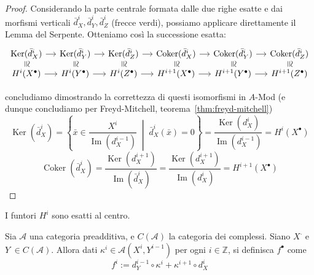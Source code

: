\begin{proof}
Considerando la parte centrale formata dalle due righe esatte e dai morfismi
verticali $\bar{d}_X^i, \bar{d}_Y^i, \bar{d}_Z^i$ (frecce verdi), possiamo
applicare direttamente il Lemma del Serpente. Otteniamo così la successione
esatta:
\[
\begin{tikzcd}[column sep=small, row sep=5pt]
    \mathrm{Ker}{(\bar{d}^{i}_X)} & \mathrm{Ker}{(\bar{d}^{i}_Y)} &
    \mathrm{Ker}{(\bar{d}^{i}_Z)} & \mathrm{Coker}{(\bar{d}^{i}_X)} &
    \mathrm{Coker}{(\bar{d}^{i}_Y)} & \mathrm{Coker}{(\bar{d}^{i}_Z)}\\
    H^{i}{(X^\bullet)} & H^{i}{(Y^\bullet)} & H^{i}{(Z^\bullet)} &
    H^{i+1}{(X^\bullet)} & H^{i+1}{(Y^\bullet)} & H^{i+1}{(Z^\bullet)}
	\arrow[from=1-1, to=1-2]
	\arrow["\cong"{marking, allow upside down}, draw=none, from=1-1, to=2-1]
	\arrow[from=1-2, to=1-3]
	\arrow["\cong"{marking, allow upside down}, draw=none, from=1-2, to=2-2]
	\arrow[from=1-3, to=1-4]
	\arrow["\cong"{marking, allow upside down}, draw=none, from=1-3, to=2-3]
	\arrow[from=1-4, to=1-5]
	\arrow["\cong"{marking, allow upside down}, draw=none, from=1-4, to=2-4]
	\arrow[from=1-5, to=1-6]
	\arrow["\cong"{marking, allow upside down}, draw=none, from=1-5, to=2-5]
	\arrow["\cong"{marking, allow upside down}, draw=none, from=1-6, to=2-6]
	\arrow[from=2-1, to=2-2]
	\arrow[from=2-2, to=2-3]
	\arrow[from=2-3, to=2-4]
	\arrow[from=2-4, to=2-5]
	\arrow[from=2-5, to=2-6]
\end{tikzcd}\]

concludiamo dimostrando la correttezza di questi isomorfismi in \(A\)-Mod (e
dunque concludiamo per Freyd-Mitchell, teorema~\ref{thm:freyd-mitchell})
    \[
    \operatorname{Ker}(\bar{d}_X^i) = \left\{ \bar{x} \in \frac{X^i}{\operatorname{Im}(d_X^{i-1})} \;\middle|\; \bar{d}_X^i(\bar{x}) = 0 \right\} = \frac{\operatorname{Ker}(d_X^i)}{\operatorname{Im}(d_X^{i-1})} = H^i(X^\bullet)
    \]
    \[
    \operatorname{Coker}(\bar{d}_X^i) = \frac{\operatorname{Ker}(d_X^{i+1})}{\operatorname{Im}(\bar{d}_X^i)} = \frac{\operatorname{Ker}(d_X^{i+1})}{\operatorname{Im}(d_X^i)} = H^{i+1}(X^\bullet)
    \]
\end{proof}

\begin{corollary}{}
    I funtori \(H^{i}\) sono esatti al centro.
\end{corollary}


Sia \(\mathcal{A}\) una categoria preadditiva, e \(C{(\mathcal{A})}\) la
categoria dei complessi. Siano \(X^{\cdot }\) e \(Y^{\cdot } \in
C{(\mathcal{A})}\). Allora dati \(\kappa^{i} \in \mathcal{A}{(X^{i}, Y^{i-1})}\)
per ogni \(i \in \mathbb{Z}\), si definisca \(f^\bullet\) come
\begin{equation}{}\label{eq:omotopia-complessi}
    f^{i} := d_Y^{i-1} \circ \kappa^{i} + \kappa^{i+1} \circ d_X^{i} 
\end{equation}

